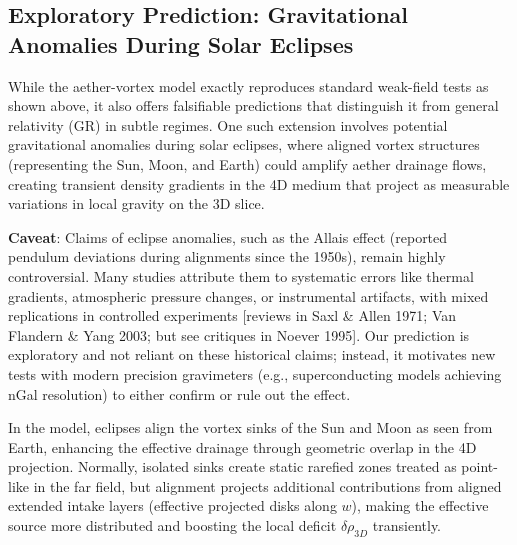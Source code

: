 \medskip
\noindent
{}
\medskip

\subsection{Exploratory Prediction: Gravitational Anomalies During Solar Eclipses}

While the aether-vortex model exactly reproduces standard weak-field tests as shown above, it also offers falsifiable predictions that distinguish it from general relativity (GR) in subtle regimes. One such extension involves potential gravitational anomalies during solar eclipses, where aligned vortex structures (representing the Sun, Moon, and Earth) could amplify aether drainage flows, creating transient density gradients in the 4D medium that project as measurable variations in local gravity on the 3D slice.

\textbf{Caveat}: Claims of eclipse anomalies, such as the Allais effect (reported pendulum deviations during alignments since the 1950s), remain highly controversial. Many studies attribute them to systematic errors like thermal gradients, atmospheric pressure changes, or instrumental artifacts, with mixed replications in controlled experiments [reviews in Saxl \& Allen 1971; Van Flandern \& Yang 2003; but see critiques in Noever 1995]. Our prediction is exploratory and not reliant on these historical claims; instead, it motivates new tests with modern precision gravimeters (e.g., superconducting models achieving nGal resolution) to either confirm or rule out the effect.

In the model, eclipses align the vortex sinks of the Sun and Moon as seen from Earth, enhancing the effective drainage through geometric overlap in the 4D projection. Normally, isolated sinks create static rarefied zones treated as point-like in the far field, but alignment projects additional contributions from aligned extended intake layers (effective projected disks along $w$), making the effective source more distributed and boosting the local deficit $\delta \rho_{3D}$ transiently.

